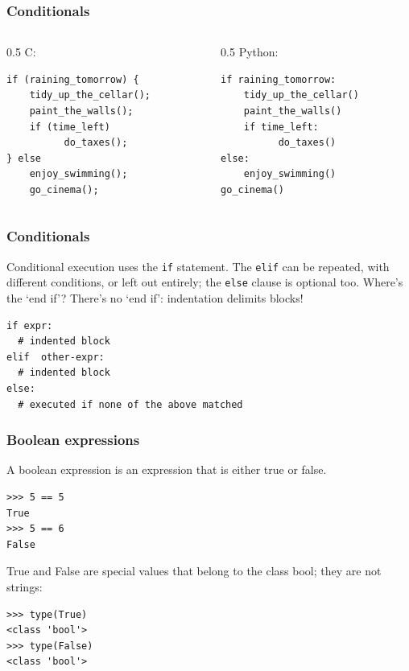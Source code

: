 \begin{frame}[fragile]\frametitle{Conditionals}
  \begin{columns}[c]
    \begin{column}{0.5\linewidth}
    C:
\begin{lstlisting}
if (raining_tomorrow) {
    tidy_up_the_cellar(); 
    paint_the_walls();
    if (time_left) 
          do_taxes();
} else
    enjoy_swimming();
    go_cinema();
\end{lstlisting}
      \end{column}
    \begin{column}{0.5\linewidth}
    Python:
    \begin{lstlisting}
if raining_tomorrow:
    tidy_up_the_cellar() 
    paint_the_walls()
    if time_left: 
          do_taxes()
else:
    enjoy_swimming()
go_cinema()
\end{lstlisting}
        \end{column}
  \end{columns}
\end{frame}

\begin{frame}[fragile]\frametitle{Conditionals}
  Conditional execution uses the \texttt{if} statement. The \texttt{elif} can be repeated, with different conditions, or left out entirely; the \texttt{else} clause is optional too. Where's the `end if'? There's no `end if': indentation delimits blocks!
\begin{lstlisting}
if expr:
  # indented block
elif  other-expr:
  # indented block
else:
  # executed if none of the above matched
\end{lstlisting}
\end{frame}

\begin{frame}[fragile]\frametitle{Boolean expressions}
A boolean expression is an expression that is either true or false.
\begin{lstlisting}
>>> 5 == 5
True
>>> 5 == 6
False
\end{lstlisting}
True and False are special values that belong to the class bool; they are not
strings:
\begin{lstlisting}
>>> type(True)
<class 'bool'>
>>> type(False)
<class 'bool'>
\end{lstlisting}
\end{frame}

